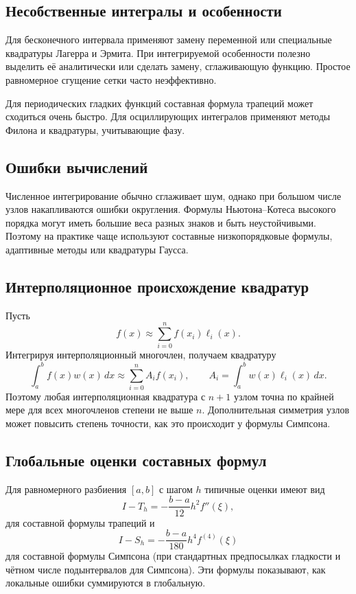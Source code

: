 \subsection{Несобственные интегралы и особенности}

Для бесконечного интервала применяют замену переменной или специальные
квадратуры Лагерра и Эрмита. При интегрируемой особенности полезно выделить её
аналитически или сделать замену, сглаживающую функцию. Простое равномерное
сгущение сетки часто неэффективно.

Для периодических гладких функций составная формула трапеций может сходиться
очень быстро. Для осциллирующих интегралов применяют методы Филона и квадратуры,
учитывающие фазу.

\subsection{Ошибки вычислений}

Численное интегрирование обычно сглаживает шум, однако при большом числе узлов
накапливаются ошибки округления. Формулы Ньютона--Котеса высокого порядка могут
иметь большие веса разных знаков и быть неустойчивыми. Поэтому на практике чаще
используют составные низкопорядковые формулы, адаптивные методы или квадратуры
Гаусса.

\subsection{Интерполяционное происхождение квадратур}

Пусть
\[
    f(x)\approx \sum_{i=0}^{n}f(x_i)\ell_i(x).
\]
Интегрируя интерполяционный многочлен, получаем квадратуру
\[
    \int_a^b f(x)w(x)\,dx
    \approx
    \sum_{i=0}^{n}A_i f(x_i),
    \qquad
    A_i=\int_a^b w(x)\ell_i(x)\,dx.
\]
Поэтому любая интерполяционная квадратура с $n+1$ узлом точна по крайней мере для всех
многочленов степени не выше $n$. Дополнительная симметрия узлов может повысить степень
точности, как это происходит у формулы Симпсона.

\subsection{Глобальные оценки составных формул}

Для равномерного разбиения $[a,b]$ с шагом $h$ типичные оценки имеют вид
\[
    I-T_h
    =-\frac{b-a}{12}h^2 f''(\xi),
\]
для составной формулы трапеций и
\[
    I-S_h
    =-\frac{b-a}{180}h^4 f^{(4)}(\xi)
\]
для составной формулы Симпсона (при стандартных предпосылках гладкости и чётном числе
подынтервалов для Симпсона). Эти формулы показывают, как локальные ошибки суммируются в
глобальную.

